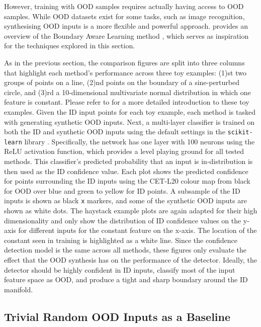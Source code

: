 However, training with OOD samples requires actually having access to OOD samples. While OOD datasets exist for some tasks, such as image recognition, synthesising OOD inputs is a more flexible and powerful approach.  provides an overview of the Boundary Aware Learning method \cite{ood-boundary-2021}, which serves as inspiration for the techniques explored in this section.

\newpar As in the previous section, the comparison figures are split into three columns that highlight each method's performance across three toy examples: (1)st two groups of points on a line, (2)nd points on the boundary of a sine-perturbed circle, and (3)rd a 10-dimensional multivariate normal distribution in which one feature is constant. Please refer to  for a more detailed introduction to these toy examples. Given the ID input points for each toy example, each method is tasked with generating synthetic OOD inputs. Next, a multi-layer classifier is trained on both the ID and synthetic OOD inputs using the default settings in the \texttt{scikit-learn} library \cite{scikit-learn-2011}. Specifically, the network has one layer with 100 neurons using the ReLU activation function, which provides a level playing ground for all tested methods. This classifier's predicted probability that an input is in-distribution is then used as the ID confidence value. Each plot shows the predicted confidence for points surrounding the ID inputs using the CET-L20 colour map \cite{color-cet-2015, color-cet-2023} from black for OOD over blue and green to yellow for ID points. A subsample of the ID inputs is shown as black \texttt{x} markers, and some of the synthetic OOD inputs are shown as white dots. The haystack example plots are again adapted for their high dimensionality and only show the distribution of ID confidence values on the y-axis for different inputs for the constant feature on the x-axis. The location of the constant seen in training is highlighted as a white line. Since the confidence detection model is the same across all methods, these figures only evaluate the effect that the OOD synthesis has on the performance of the detector. Ideally, the detector should be highly confident in ID inputs, classify most of the input feature space as OOD, and produce a tight and sharp boundary around the ID manifold.

\subsection{Trivial Random OOD Inputs as a Baseline} \label{txt:uniform-ood-synthesis-analysis}

